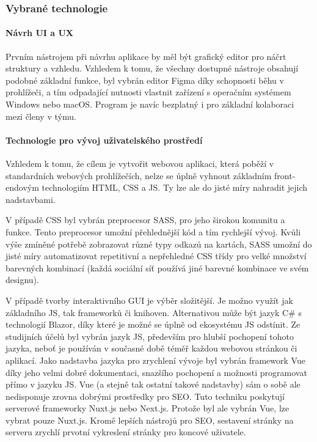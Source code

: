 		\subsubsection{Vybrané technologie}

			\paragraph{Návrh UI a UX}

			Prvním nástrojem při návrhu aplikace by měl být grafický editor pro náčrt struktury a vzhledu.
			Vzhledem k tomu, že všechny dostupné nástroje obsahují podobné základní funkce, byl vybrán editor Figma díky
			schopnosti běhu v prohlížeči, a tím odpadající nutnosti vlastnit zařízení s operačním systémem Windows nebo macOS.
			Program je navíc bezplatný i pro základní kolaboraci mezi členy v týmu.

			\paragraph{Technologie pro vývoj uživatelského prostředí}

			Vzhledem k tomu, že cílem je vytvořit webovou aplikaci, která poběží v standardních webových prohlížečích,
			nelze se úplně vyhnout základním front-endovým technologiím \Ac{HTML}, \Ac{CSS} a \ac{JS}.
			Ty lze ale do jisté míry nahradit jejich nadstavbami.

			V případě \Ac{CSS} byl vybrán preprocesor \Ac{SASS}, pro jeho širokou komunitu a funkce.
			Tento preprocesor umožní přehlednější kód a tím rychlejší vývoj.
			Kvůli výše zmíněné potřebě zobrazovat různé typy odkazů na kartách, \ac{SASS} umožní
			do jisté míry automatizovat repetitivní a nepřehledné \ac{CSS} třídy pro velké množství barevných kombinací
			(každá sociální síť používá jiné barevné kombinace ve svém designu).

			V případě tvorby interaktivního \Ac{GUI} je výběr složitější.
			Je možno využít jak základního \ac{JS}, tak frameworků či knihoven.
			Alternativou může být jazyk C\# s technologií Blazor, díky které je možné se úplně od ekosystému
			\ac{JS} odstínit.
			Ze studijních účelů byl vybrán jazyk \ac{JS}, především pro hlubší pochopení tohoto jazyka, neboť je používán v současné
			době téměř každou webovou stránkou či aplikací.
			Jako nadstavba jazyka pro zrychlení vývoje byl vybrán framework Vue díky jeho velmi dobré dokumentaci, snazšího
			pochopení a možnosti programovat přímo v jazyku \ac{JS}.
			Vue (a stejně tak ostatní takové nadstavby) sám o sobě ale nedisponuje zrovna dobrými prostředky pro \Ac{SEO}.
			Tuto techniku poskytují serverové frameworky Nuxt.js nebo Next.js.
			Protože byl ale vybrán Vue, lze vybrat pouze Nuxt.js.
			Kromě lepších nástrojů pro \ac{SEO}, sestavení stránky na serveru zrychlí prvotní vykreslení stránky pro
			koncové uživatele.

